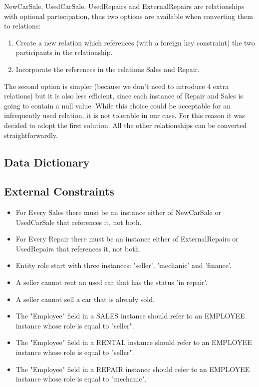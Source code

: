 NewCarSale, UsedCarSale, UsedRepairs and ExternalRepairs are relationships with optional partecipation, thus two options are available when converting them to relations:
\begin{enumerate}
	\item Create a new relation which references (with a foreign key constraint) the two participants in the relationship.
	\item Incorporate the references in the relations Sales and Repair.
\end{enumerate}
The second option is simpler (because we don't need to introduce 4 extra relations) but it is also less efficient, since each instance of Repair and Sales is going to contain a null value. While this choice could be acceptable for an infrequently used relation, it is not tolerable in our case. For this reason it was decided to adopt the first solution.
All the other relationships can be converted straightforwardly.

\subsection{Data Dictionary}



\subsection{External Constraints}
\begin{itemize}
	\item For Every Sales there must be an instance either of NewCarSale or UsedCarSale that references it, not both.
	\item For Every Repair there must be an instance either of ExternalRepairs or UsedRepairs that references it, not both.
	\item Entity role start with three instances: 'seller', 'mechanic' and 'finance'.
	\item A seller cannot rent an used car that has the status 'in repair'.
	\item A seller cannot sell a car that is already sold.
	\item The "Employee" field in a SALES instance should refer to an EMPLOYEE instance whose role is equal to "seller".
	\item The "Employee" field in a RENTAL instance should refer to an EMPLOYEE instance whose role is equal to "seller".
	\item The "Employee" field in a REPAIR instance should refer to an EMPLOYEE instance whose role is equal to "mechanic".
\end{itemize}